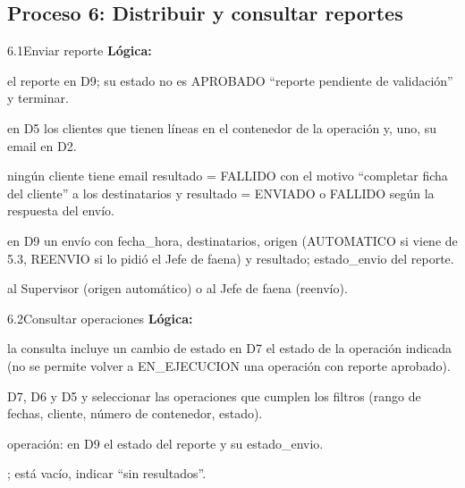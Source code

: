 \subsection{Proceso 6: Distribuir y consultar reportes}

\begin{minispec}{6.1}{Enviar reporte}
\textbf{Lógica:}
\begin{logica}
    \item {} el reporte en D9;  su estado no es APROBADO 
     ``reporte pendiente de validación'' y terminar.
    \item {} en D5 los clientes que tienen líneas en el contenedor de la operación y,
     uno,  su email en D2.
    \item {} ningún cliente tiene email  resultado = FALLIDO con el motivo
    ``completar ficha del cliente''   a los destinatarios y
    resultado = ENVIADO o FALLIDO según la respuesta del envío.
    \item {} en D9 un envío con fecha\_hora, destinatarios, origen (AUTOMATICO si
    viene de 5.3, REENVIO si lo pidió el Jefe de faena) y resultado; 
    estado\_envio del reporte.
    \item {}  al Supervisor (origen automático) o al Jefe de
    faena (reenvío).
\end{logica}
\end{minispec}

\begin{minispec}{6.2}{Consultar operaciones}
\textbf{Lógica:}
\begin{logica}
    \item {} la consulta incluye un cambio de estado  en D7 el
    estado de la operación indicada (no se permite volver a EN\_EJECUCION una operación con
    reporte aprobado).
    \item {} D7, D6 y D5 y seleccionar las operaciones que cumplen los filtros (rango
    de fechas, cliente, número de contenedor, estado).
    \item {} operación:  en D9 el estado del reporte y su estado\_envio.
    \item {} ;  está vacío, indicar ``sin
    resultados''.
\end{logica}
\end{minispec}

